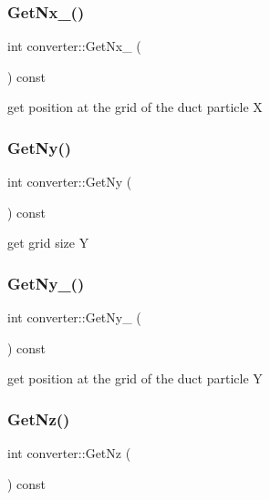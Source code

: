 \subsubsection{\texorpdfstring{Get\+Nx\+\_()}{GetNx\_0()}}
{\footnotesize\ttfamily int converter\+::\+Get\+Nx\+\_ (\begin{DoxyParamCaption}{ }\end{DoxyParamCaption}) const}



get position at the grid of the duct particle X 

\mbox{\label{classconverter_a01bbb22fc729f7ec1c48ffada82922aa}} 
\subsubsection{\texorpdfstring{Get\+Ny()}{GetNy()}}
{\footnotesize\ttfamily int converter\+::\+Get\+Ny (\begin{DoxyParamCaption}{ }\end{DoxyParamCaption}) const}



get grid size Y 

\mbox{\label{classconverter_a43a45f0717ab21a88349d6ea66be55f2}} 
\subsubsection{\texorpdfstring{Get\+Ny\+\_()}{GetNy\_0()}}
{\footnotesize\ttfamily int converter\+::\+Get\+Ny\+\_ (\begin{DoxyParamCaption}{ }\end{DoxyParamCaption}) const}



get position at the grid of the duct particle Y 

\mbox{\label{classconverter_ac9b3c0f9d011f2979fcc8eb886043f55}} 
\subsubsection{\texorpdfstring{Get\+Nz()}{GetNz()}}
{\footnotesize\ttfamily int converter\+::\+Get\+Nz (\begin{DoxyParamCaption}{ }\end{DoxyParamCaption}) const}




